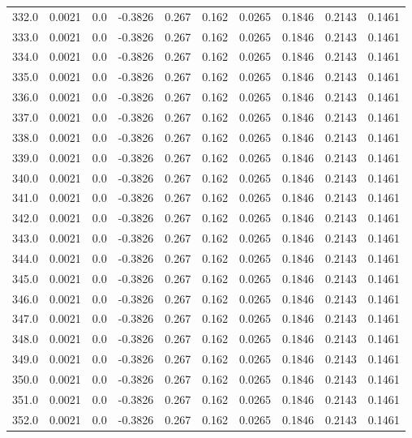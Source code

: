 \begin{longtable}{lrrrrrrrrr}
332.0 & 0.0021 & 0.0 & -0.3826 & 0.267 & 0.162 & 0.0265 & 0.1846 & 0.2143 & 0.1461 \\
333.0 & 0.0021 & 0.0 & -0.3826 & 0.267 & 0.162 & 0.0265 & 0.1846 & 0.2143 & 0.1461 \\
334.0 & 0.0021 & 0.0 & -0.3826 & 0.267 & 0.162 & 0.0265 & 0.1846 & 0.2143 & 0.1461 \\
335.0 & 0.0021 & 0.0 & -0.3826 & 0.267 & 0.162 & 0.0265 & 0.1846 & 0.2143 & 0.1461 \\
336.0 & 0.0021 & 0.0 & -0.3826 & 0.267 & 0.162 & 0.0265 & 0.1846 & 0.2143 & 0.1461 \\
337.0 & 0.0021 & 0.0 & -0.3826 & 0.267 & 0.162 & 0.0265 & 0.1846 & 0.2143 & 0.1461 \\
338.0 & 0.0021 & 0.0 & -0.3826 & 0.267 & 0.162 & 0.0265 & 0.1846 & 0.2143 & 0.1461 \\
339.0 & 0.0021 & 0.0 & -0.3826 & 0.267 & 0.162 & 0.0265 & 0.1846 & 0.2143 & 0.1461 \\
340.0 & 0.0021 & 0.0 & -0.3826 & 0.267 & 0.162 & 0.0265 & 0.1846 & 0.2143 & 0.1461 \\
341.0 & 0.0021 & 0.0 & -0.3826 & 0.267 & 0.162 & 0.0265 & 0.1846 & 0.2143 & 0.1461 \\
342.0 & 0.0021 & 0.0 & -0.3826 & 0.267 & 0.162 & 0.0265 & 0.1846 & 0.2143 & 0.1461 \\
343.0 & 0.0021 & 0.0 & -0.3826 & 0.267 & 0.162 & 0.0265 & 0.1846 & 0.2143 & 0.1461 \\
344.0 & 0.0021 & 0.0 & -0.3826 & 0.267 & 0.162 & 0.0265 & 0.1846 & 0.2143 & 0.1461 \\
345.0 & 0.0021 & 0.0 & -0.3826 & 0.267 & 0.162 & 0.0265 & 0.1846 & 0.2143 & 0.1461 \\
346.0 & 0.0021 & 0.0 & -0.3826 & 0.267 & 0.162 & 0.0265 & 0.1846 & 0.2143 & 0.1461 \\
347.0 & 0.0021 & 0.0 & -0.3826 & 0.267 & 0.162 & 0.0265 & 0.1846 & 0.2143 & 0.1461 \\
348.0 & 0.0021 & 0.0 & -0.3826 & 0.267 & 0.162 & 0.0265 & 0.1846 & 0.2143 & 0.1461 \\
349.0 & 0.0021 & 0.0 & -0.3826 & 0.267 & 0.162 & 0.0265 & 0.1846 & 0.2143 & 0.1461 \\
350.0 & 0.0021 & 0.0 & -0.3826 & 0.267 & 0.162 & 0.0265 & 0.1846 & 0.2143 & 0.1461 \\
351.0 & 0.0021 & 0.0 & -0.3826 & 0.267 & 0.162 & 0.0265 & 0.1846 & 0.2143 & 0.1461 \\
352.0 & 0.0021 & 0.0 & -0.3826 & 0.267 & 0.162 & 0.0265 & 0.1846 & 0.2143 & 0.1461 \\

\end{longtable}
